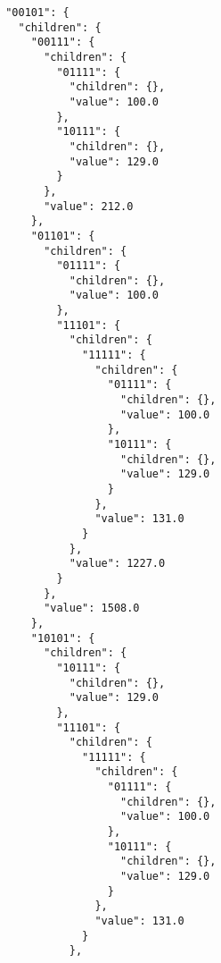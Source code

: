 \documentclass{article}
\begin{document}
\begin{listing}
\begin{verbatim}
                    "00101": {
                      "children": {
                        "00111": {
                          "children": {
                            "01111": {
                              "children": {},
                              "value": 100.0
                            },
                            "10111": {
                              "children": {},
                              "value": 129.0
                            }
                          },
                          "value": 212.0
                        },
                        "01101": {
                          "children": {
                            "01111": {
                              "children": {},
                              "value": 100.0
                            },
                            "11101": {
                              "children": {
                                "11111": {
                                  "children": {
                                    "01111": {
                                      "children": {},
                                      "value": 100.0
                                    },
                                    "10111": {
                                      "children": {},
                                      "value": 129.0
                                    }
                                  },
                                  "value": 131.0
                                }
                              },
                              "value": 1227.0
                            }
                          },
                          "value": 1508.0
                        },
                        "10101": {
                          "children": {
                            "10111": {
                              "children": {},
                              "value": 129.0
                            },
                            "11101": {
                              "children": {
                                "11111": {
                                  "children": {
                                    "01111": {
                                      "children": {},
                                      "value": 100.0
                                    },
                                    "10111": {
                                      "children": {},
                                      "value": 129.0
                                    }
                                  },
                                  "value": 131.0
                                }
                              },

\end{verbatim}
\end{listing}
\end{document}
